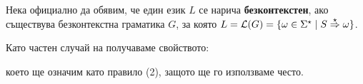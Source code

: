 

Нека официално да обявим, че един език $L$ се нарича {\bf безконтекстен}, ако съществува безконтекстна граматика $G$, за която 
$L = \L(G) = \{\omega \in \Sigma^\star \mid S \derive{\star} \omega\}$.


\begin{remark}
  Като частен случай на  получаваме свойството:
  \begin{prooftree}
  \end{prooftree}
  което ще означим като правило (2), защото ще го използваме често.
\end{remark}

